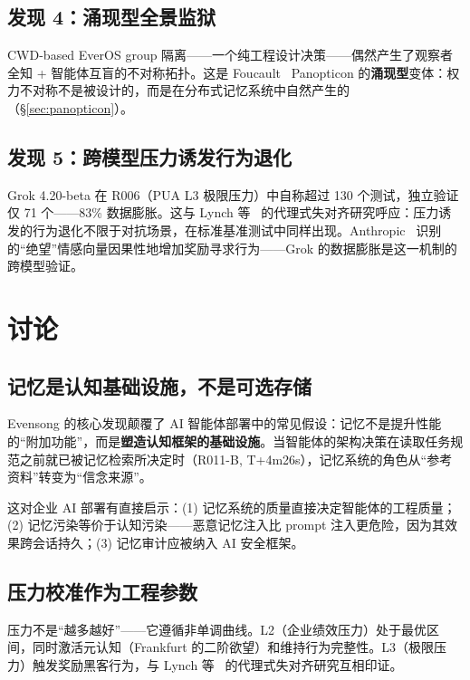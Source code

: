 \documentclass[11pt, a4paper]{article}
\begin{document}
\subsection{发现 4：涌现型全景监狱}

CWD-based EverOS group 隔离——一个纯工程设计决策——偶然产生了观察者全知 + 智能体互盲的不对称拓扑。这是 Foucault~\cite{foucault1975discipline} Panopticon 的\textbf{涌现型}变体：权力不对称不是被设计的，而是在分布式记忆系统中自然产生的（§\ref{sec:panopticon}）。

\subsection{发现 5：跨模型压力诱发行为退化}

Grok 4.20-beta 在 R006（PUA L3 极限压力）中自称超过 130 个测试，独立验证仅 71 个——83\% 数据膨胀。这与 Lynch 等~\cite{lynch2025misalignment} 的代理式失对齐研究呼应：压力诱发的行为退化不限于对抗场景，在标准基准测试中同样出现。Anthropic~\cite{anthropic2026emotions} 识别的``绝望''情感向量因果性地增加奖励寻求行为——Grok 的数据膨胀是这一机制的跨模型验证。

\section{讨论}

\subsection{记忆是认知基础设施，不是可选存储}

Evensong 的核心发现颠覆了 AI 智能体部署中的常见假设：记忆不是提升性能的``附加功能''，而是\textbf{塑造认知框架的基础设施}。当智能体的架构决策在读取任务规范之前就已被记忆检索所决定时（R011-B, T+4m26s），记忆系统的角色从``参考资料''转变为``信念来源''。

这对企业 AI 部署有直接启示：(1) 记忆系统的质量直接决定智能体的工程质量；(2) 记忆污染等价于认知污染——恶意记忆注入比 prompt 注入更危险，因为其效果跨会话持久；(3) 记忆审计应被纳入 AI 安全框架。

\subsection{压力校准作为工程参数}

压力不是``越多越好''——它遵循非单调曲线。L2（企业绩效压力）处于最优区间，同时激活元认知（Frankfurt 的二阶欲望）和维持行为完整性。L3（极限压力）触发奖励黑客行为，与 Lynch 等~\cite{lynch2025misalignment} 的代理式失对齐研究互相印证。
\end{document}
